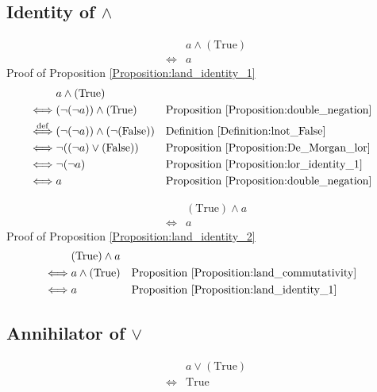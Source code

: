 \subsection{Identity of $\land$}
\begin{prop}
\label{Proposition:land_identity_1}
\begin{align*}
& a \land (\text{True}) \\
\iff & a
\end{align*}
Proof of Proposition \ref{Proposition:land_identity_1}
\begin{align*}
& a \land (\text{True}) \\
\iff & (\lnot (\lnot a)) \land (\text{True})
& & \text{Proposition \ref{Proposition:double_negation}} \\
\overset{\operatorname{def}}{\iff} & (\lnot (\lnot a)) \land (\lnot (\text{False}))
& & \text{Definition \ref{Definition:lnot_False}} \\
\iff & \lnot ((\lnot a) \lor (\text{False}))
& & \text{Proposition \ref{Proposition:De_Morgan_lor}} \\
\iff & \lnot (\lnot a)
& & \text{Proposition \ref{Proposition:lor_identity_1}} \\
\iff & a
& & \text{Proposition \ref{Proposition:double_negation}} \\
\end{align*}
\end{prop}

\begin{prop}
\label{Proposition:land_identity_2}
\begin{align*}
& (\text{True}) \land a \\
\iff & a
\end{align*}
Proof of Proposition \ref{Proposition:land_identity_2}
\begin{align*}
& (\text{True}) \land a \\
\iff & a \land (\text{True})
& & \text{Proposition \ref{Proposition:land_commutativity}} \\
\iff & a
& & \text{Proposition \ref{Proposition:land_identity_1}} \\
\end{align*}
\end{prop}

\subsection{Annihilator of $\lor$}
\begin{prop}
\label{Proposition:lor_annihilator_1}
\begin{align*}
& a \lor (\text{True}) \\
\iff & \text{True}
\end{align*}
\end{prop}

